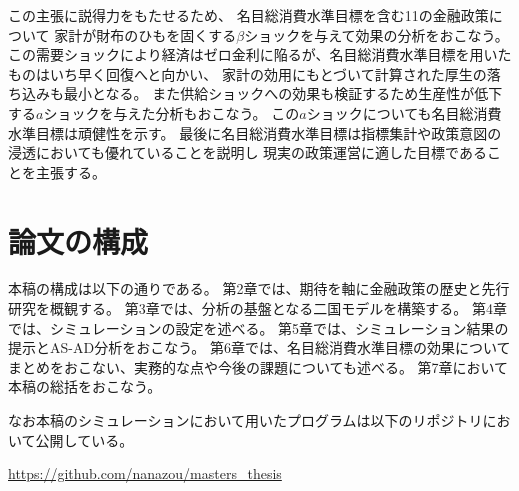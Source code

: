 この主張に説得力をもたせるため、
名目総消費水準目標を含む11の金融政策について
家計が財布のひもを固くする\(\beta\)ショックを与えて効果の分析をおこなう。
この需要ショックにより経済はゼロ金利に陥るが、名目総消費水準目標を用いたものはいち早く回復へと向かい、
家計の効用にもとづいて計算された厚生の落ち込みも最小となる。
また供給ショックへの効果も検証するため生産性が低下する\(a\)ショックを与えた分析もおこなう。
この\(a\)ショックについても名目総消費水準目標は頑健性を示す。
最後に名目総消費水準目標は指標集計や政策意図の浸透においても優れていることを説明し
現実の政策運営に適した目標であることを主張する。

\section{論文の構成}
\label{sec:chapter1_structure}
本稿の構成は以下の通りである。
第2章では、期待を軸に金融政策の歴史と先行研究を概観する。
第3章では、分析の基盤となる二国モデルを構築する。
第4章では、シミュレーションの設定を述べる。
第5章では、シミュレーション結果の提示とAS-AD分析をおこなう。
第6章では、名目総消費水準目標の効果についてまとめをおこない、実務的な点や今後の課題についても述べる。
第7章において本稿の総括をおこなう。

なお本稿のシミュレーションにおいて用いたプログラムは以下のリポジトリにおいて公開している。

\url{https://github.com/nanazou/masters_thesis}